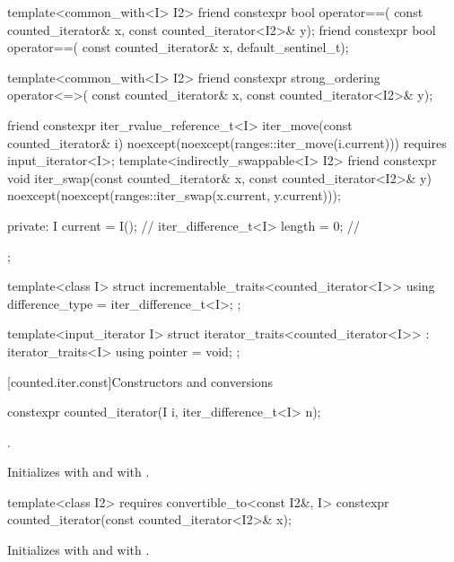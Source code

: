 \begin{codeblock}
{{    template<common_with<I> I2>
      friend constexpr bool operator==(
        const counted_iterator& x, const counted_iterator<I2>& y);
    friend constexpr bool operator==(
      const counted_iterator& x, default_sentinel_t);

    template<common_with<I> I2>
      friend constexpr strong_ordering operator<=>(
        const counted_iterator& x, const counted_iterator<I2>& y);

    friend constexpr iter_rvalue_reference_t<I> iter_move(const counted_iterator& i)
      noexcept(noexcept(ranges::iter_move(i.current)))
        requires input_iterator<I>;
    template<indirectly_swappable<I> I2>
      friend constexpr void iter_swap(const counted_iterator& x, const counted_iterator<I2>& y)
        noexcept(noexcept(ranges::iter_swap(x.current, y.current)));

  private:
    I current = I();                    // \expos
    iter_difference_t<I> length = 0;    // \expos
  };

  template<class I>
  struct incrementable_traits<counted_iterator<I>> {
    using difference_type = iter_difference_t<I>;
  };

  template<input_iterator I>
  struct iterator_traits<counted_iterator<I>> : iterator_traits<I> {
    using pointer = void;
  };
}
\end{codeblock}

[counted.iter.const]{Constructors and conversions}

%
\begin{itemdecl}
constexpr counted_iterator(I i, iter_difference_t<I> n);
\end{itemdecl}

\begin{itemdescr}
\pnum
\expects
{}.

\pnum
\effects
Initializes  with  and
 with .
\end{itemdescr}

%
\begin{itemdecl}
template<class I2>
  requires convertible_to<const I2&, I>
    constexpr counted_iterator(const counted_iterator<I2>& x);
\end{itemdecl}

\begin{itemdescr}
\pnum
\effects
Initializes  with  and
 with .
\end{itemdescr}

